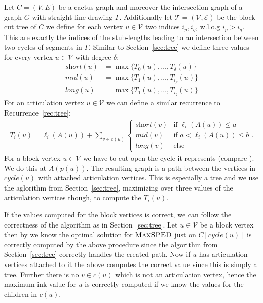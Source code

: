 \documentclass[a4paper,english,numberwithinsect]{eurocg18}
\newcommand{\maxsped}{\ensuremath{\textsc{MaxSPED}}\xspace}
\newcommand{\sollong}{\ensuremath{\textit{long}}\xspace}
\newcommand{\solmid}{\ensuremath{\textit{mid}}\xspace}
\newcommand{\solshort}{\ensuremath{\textit{short}}\xspace}
\begin{document}
Let $ C = (V,E) $ be a cactus graph and moreover the intersection graph of a graph $ G $ with straight-line drawing $ \Gamma $. Additionally let $ \mathcal T = (\mathcal V, \mathcal E) $ be the block-cut tree of $ C $ we define for each vertex $ u \in \mathcal V $ two indices $ i_p,i_q $, w.l.o.g $ i_p > i_q $. This are exactly the indices of the stub-lengths leading to an intersection between two cycles of segments in $ \Gamma $. Similar to Section~\ref{sec:tree} we define three values for every vertex $ u \in \mathcal V $ with degree $ \delta $:
\begin{align*}
	\solshort(u) &= \max\{T_0(u),\dots,T_\delta(u)\}\\
	\solmid(u) &= \max\{T_1(u),\dots,T_{i_p}(u)\}\\
	\sollong(u) &= \max\{T_1(u),\dots,T_{i_q}(u)\}
\end{align*}
For an articulation vertex $ u \in \mathcal V $ we can define a similar recurrence to Recurrence~\ref{rec:tree}:
\begin{align}
\label{rec:cactus_articulation}
T_i(u) = \ell_i(A(u)) + \sum_{v \in c(u)}
\begin{cases}
\solshort(v) & \text{if } \ell_i(A(u)) \leq a \\
\solmid(v) & \text{if } a < \ell_i(A(u)) \leq b \\
\sollong(v) & \text{else}
\end{cases}.
\end{align}
For a block vertex $ u \in \mathcal V $ we have to cut open the cycle it represents (compare \cite{bcgkmn-pped-17}). We do this at $ A(p(u)) $. The resulting graph is a path between the vertices in $ \textit{cycle}(u) $ with attached articulation vertices. This is especially a tree and we use the aglorithm from Section~\ref{sec:tree}, maximizing over three values of the articulation vertices though,  to compute the $ T_i(u) $.

If the values computed for the block vertices is correct, we can follow the correctness of the algorithm as in Section~\ref{sec:tree}. Let $ u \in \mathcal V $ be a block vertex then by \cite{bcgkmn-pped-17} we know the optimal solution for \maxsped just on $ C[\textit{cycle}(u)] $ is correctly computed by the above procedure since the algorithm from Section~\ref{sec:tree} correctly handles the created path. Now if $ u $ has articulation vertices attached to it the above computes the correct value since this is simply a tree. Further there is no $ v \in c(u) $ which is not an articulation vertex, hence the maximum ink value for $ u $ is correctly computed if we know the values for the children in $ c(u) $.
\end{document}
